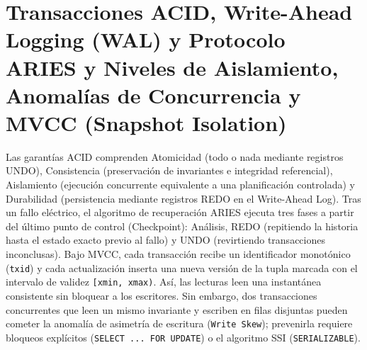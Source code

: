 \documentclass{book}
\begin{document}
\section{Transacciones ACID, Write-Ahead Logging (WAL) y Protocolo ARIES y Niveles de Aislamiento, Anomalías de Concurrencia y MVCC (Snapshot Isolation)}

Las garantías ACID comprenden Atomicidad (todo o nada mediante registros UNDO), Consistencia (preservación de invariantes e integridad referencial), Aislamiento (ejecución concurrente equivalente a una planificación controlada) y Durabilidad (persistencia mediante registros REDO en el Write-Ahead Log). Tras un fallo eléctrico, el algoritmo de recuperación ARIES ejecuta tres fases a partir del último punto de control (Checkpoint): Análisis, REDO (repitiendo la historia hasta el estado exacto previo al fallo) y UNDO (revirtiendo transacciones inconclusas).
Bajo MVCC, cada transacción recibe un identificador monotónico (\texttt{txid}) y cada actualización inserta una nueva versión de la tupla marcada con el intervalo de validez \texttt{[xmin, xmax)}. Así, las lecturas leen una instantánea consistente sin bloquear a los escritores. Sin embargo, dos transacciones concurrentes que leen un mismo invariante y escriben en filas disjuntas pueden cometer la anomalía de asimetría de escritura (\texttt{Write Skew}); prevenirla requiere bloqueos explícitos (\texttt{SELECT ... FOR UPDATE}) o el algoritmo SSI (\texttt{SERIALIZABLE}).
\end{document}
